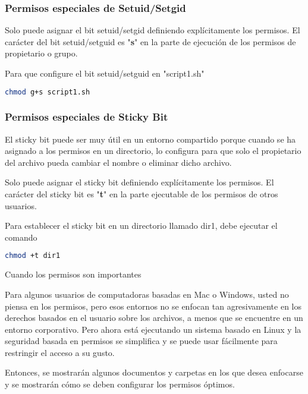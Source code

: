 \begin{frame}[fragile]
  \frametitle{Permisos especiales de Setuid/Setgid}
  Solo puede asignar el bit setuid/setgid definiendo explícitamente los
  permisos. El carácter del bit setuid/setguid es "\textbf{s}" en la parte de
  ejecución de los permisos de propietario o grupo.

  \vspace{\baselineskip}
  Para que configure el bit setuid/setguid en "script1.sh" 

  \begin{lstlisting}[language=Bash]
chmod g+s script1.sh
  \end{lstlisting}
\end{frame}

\begin{frame}[fragile]
  \frametitle{Permisos especiales de Sticky Bit}
  El sticky bit puede ser muy útil en un entorno compartido porque cuando
  se ha asignado a los permisos en un directorio, lo configura para que solo
  el propietario del archivo pueda cambiar el nombre o eliminar dicho archivo.

  \vspace{\baselineskip}
  Solo puede asignar el sticky bit definiendo explícitamente los permisos.
  El carácter del sticky bit es "\textbf{t}" en la parte ejecutable de los
  permisos de otros usuarios.

  \vspace{\baselineskip}
  Para establecer el sticky bit en un directorio llamado dir1, debe ejecutar
  el comando
  \begin{lstlisting}[language=Bash]
chmod +t dir1
  \end{lstlisting}
\end{frame}

\begin{frame}[c]{Cuando los permisos son importantes}

  Para algunos usuarios de computadoras basadas en Mac o Windows,
  usted no piensa en los permisos, pero esos entornos no se enfocan tan
  agresivamente en los derechos basados en el usuario sobre los archivos,
  a menos que se encuentre en un entorno corporativo. Pero ahora está
  ejecutando un sistema basado en Linux y la seguridad basada en permisos
  se simplifica y se puede usar fácilmente para restringir el acceso a su
  gusto.

  \vspace{\baselineskip}
  Entonces, se mostrarán algunos documentos y carpetas en los que desea
  enfocarse y se mostrarán cómo se deben configurar los permisos óptimos.
\end{frame}

